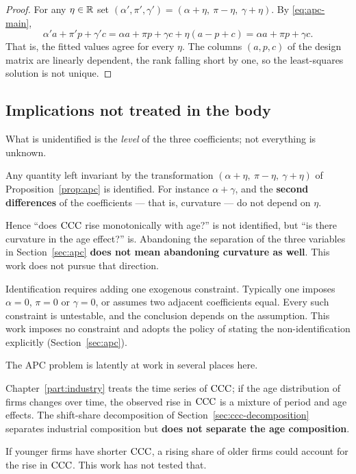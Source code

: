 \begin{proof}
For any $\eta\in\mathbb{R}$ set $(\alpha',\pi',\gamma') = (\alpha+\eta,\ \pi-\eta,\ \gamma+\eta)$.
By \eqref{eq:apc-main},
\[
\alpha' a + \pi' p + \gamma' c
= \alpha a + \pi p + \gamma c + \eta(a - p + c)
= \alpha a + \pi p + \gamma c .
\]
That is, the fitted values agree for every $\eta$. The columns $(a,p,c)$ of the design matrix are
linearly dependent, the rank falling short by one, so the least-squares solution is not unique.
\end{proof}

\subsection{Implications not treated in the body}

\begin{remark}
\label{rem:apc-identified}
What is unidentified is the \emph{level} of the three coefficients; not everything is unknown.

Any quantity left invariant by the transformation $(\alpha+\eta,\ \pi-\eta,\ \gamma+\eta)$ of
Proposition~\ref{prop:apc} is identified. For instance $\alpha+\gamma$, and the \textbf{second
differences} of the coefficients — that is, curvature — do not depend on $\eta$.

Hence ``does $\mathrm{CCC}$ rise monotonically with age?'' is not identified, but ``is there curvature in
the age effect?'' is. Abandoning the separation of the three variables in Section~\ref{sec:apc}
\textbf{does not mean abandoning curvature as well}. This work does not pursue that direction.
\end{remark}

\begin{remark}
Identification requires adding one exogenous constraint. Typically one imposes $\alpha=0$,
$\pi=0$ or $\gamma=0$, or assumes two adjacent coefficients equal. Every such constraint is
untestable, and the conclusion depends on the assumption. This work imposes no constraint and
adopts the policy of stating the non-identification explicitly (Section~\ref{sec:apc}).
\end{remark}

\begin{remark}
\label{rem:apc-in-this-work}
The APC problem is latently at work in several places here.

Chapter~\ref{part:industry} treats the time series of $\mathrm{CCC}$; if the age distribution of firms
changes over time, the observed rise in $\mathrm{CCC}$ is a mixture of period and age effects. The
shift-share decomposition of Section~\ref{sec:ccc-decomposition} separates industrial composition
but \textbf{does not separate the age composition}.

If younger firms have shorter $\mathrm{CCC}$, a rising share of older firms could account for the rise in
$\mathrm{CCC}$. This work has not tested that.
\end{remark}

